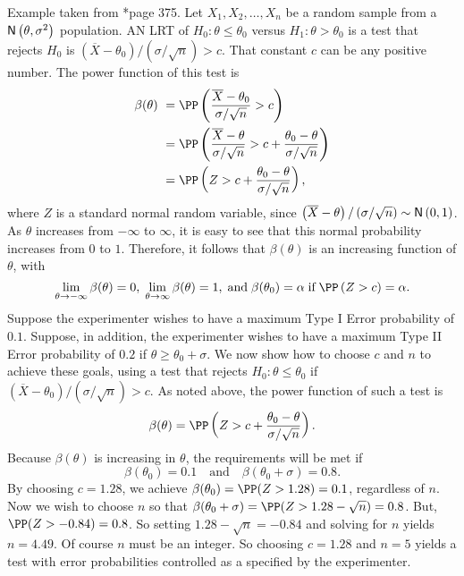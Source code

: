 \begin{exam} \label{exam: normal_pow_func}
    Example taken from \cite{CasellaGeorge2001SI}*{page 375}. Let $X_1, X_2 , \ldots , X_n$ be a random sample from a ${\sf N} \left( \theta , \sigma^2 \right)$ population. AN LRT of $H_0 : \theta \leq \theta_0$ versus $H_1 : \theta > \theta_0$ is a test that rejects $H_0$ is $\left( \overline{X} - \theta_0 \right) / \left( \sigma / \sqrt{n} \right) > c$. That constant $c$ can be any positive number. The power function of this test is
    \begin{align*}
        \beta (\theta) \
         & = \PP \left( \frac{\overline{X} - \theta_0}{\sigma / \sqrt{n}} > c \right)                                             \\
         & = \PP \left( \frac{\overline{X} - \theta}{\sigma / \sqrt{n}} > c + \frac{\theta_0 - \theta}{\sigma / \sqrt{n}} \right) \\
         & = \PP \left( Z > c + \frac{\theta_0 - \theta}{\sigma / \sqrt{n}} \right),
    \end{align*}
    where $Z$ is a standard normal random variable, since $\left( \overline{X} - \theta \right) / \left( \sigma / \sqrt{n} \right) \sim {\sf N} \left( 0,1 \right)$. As $\theta$ increases from $-\infty$ to $\infty$, it is easy to see that this normal probability increases from $0$ to $1$. Therefore, it follows that $\beta (\theta)$ is an increasing function of $\theta$, with
    \begin{equation*}
        \lim_{\theta \to - \infty} \beta (\theta) =0 , \; \lim_{\theta \to \infty} \beta (\theta) = 1 , \; \text{and} \; \beta (\theta_0) = \alpha \; \text{if} \; \PP \left( Z > c \right) = \alpha.
    \end{equation*}
    Suppose the experimenter wishes to have a maximum Type I Error probability of $0.1$. Suppose, in addition, the experimenter wishes to have a maximum Type II Error probability of $0.2$ if $\theta \geq \theta_0 + \sigma$. We now show how to choose $c$ and $n$ to achieve these goals, using a test that rejects $H_0 : \theta \leq \theta_0$ if $\left( \overline{X} - \theta_0 \right) / \left( \sigma / \sqrt{n} \right) > c$. As noted above, the power function of such a test is
    \begin{equation*}
        \beta (\theta) = \PP \left( Z > c + \frac{\theta_0 - \theta}{\sigma / \sqrt{n}} \right).
    \end{equation*}
    Because $\beta (\theta)$ is increasing in $\theta$, the requirements will be met if
    \begin{equation*}
        \beta (\theta_0) = 0.1 \quad \text{and} \quad \beta (\theta_0 + \sigma) = 0.8.
    \end{equation*}
    By choosing $c=1.28$, we achieve $\beta (\theta_0) = \PP (Z > 1.28) = 0.1$, regardless of $n$. Now we wish to choose $n$ so that $\beta (\theta_0 + \sigma) = \PP (Z > 1.28 - \sqrt{n}) = 0.8$. But, $\PP (Z>-0.84) = 0.8$. So setting $1.28 - \sqrt{n} = -0.84$ and solving for $n$ yields $n = 4.49$. Of course $n$ must be an integer. So choosing $c=1.28$ and $n=5$ yields a test with error probabilities controlled as a specified by the experimenter.
\end{exam}


